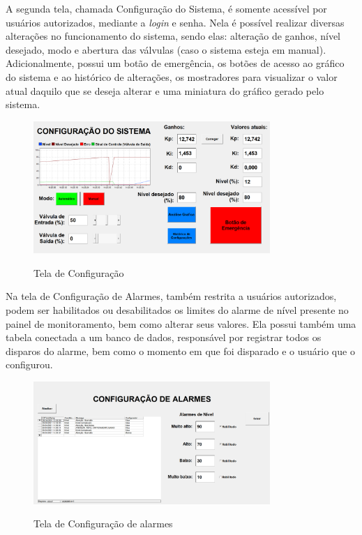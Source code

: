 \documentclass[
	article,			%
	11pt,				%
	oneside,			%
	a4paper,			%
	section=TITLE,		%
	english,			%
	brazil,				%
	sumario=tradicional
	]{abntex2}
\begin{document}
A segunda tela, chamada Configuração do Sistema, é somente acessível por usuários autorizados, mediante a \textit{login} e senha. Nela é possível realizar diversas alterações no funcionamento do sistema, sendo elas: alteração de ganhos, nível desejado, modo e abertura das válvulas (caso o sistema esteja em manual). Adicionalmente, possui um botão de emergência, os botões de acesso ao gráfico do sistema e ao histórico de alterações, os mostradores para visualizar o valor atual daquilo que se deseja alterar e uma miniatura do gráfico gerado pelo sistema.

\begin{figure}[H]
    \centering
    \caption{Tela de Configuração} \includegraphics[width=0.8\textwidth]{img/ui_config.png}
    \label{fig:tel2}
\end{figure}

Na tela de Configuração de Alarmes, também restrita a usuários autorizados, podem ser habilitados ou desabilitados os limites do alarme de nível presente no painel de monitoramento, bem como alterar seus valores. Ela possui também uma tabela conectada a um banco de dados, responsável por registrar todos os disparos do alarme, bem como o momento em que foi disparado e o usuário que o configurou.

\begin{figure}[H]
    \centering
    \caption{Tela de Configuração de alarmes} \includegraphics[width=0.8\textwidth]{img/ui_alarm.png}
    \label{fig:ui_alarm}
\end{figure}
\end{document}
